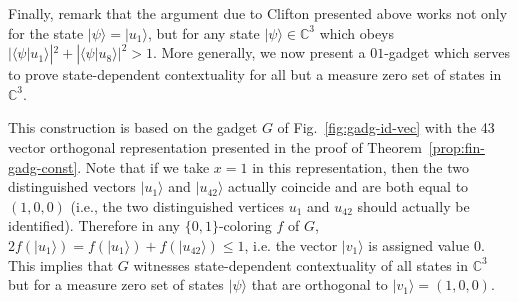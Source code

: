\documentclass[twocolumn, a4paper, superscriptaddress,nofootinbib, accepted=2020-08-07, hyperref]{quantumarticle}
\begin{document}
Finally, remark that the argument due to Clifton presented above works not only for the state $|\psi\rangle=|u_1\rangle$, but for any state $|\psi \rangle \in \mathbb{C}^3$ which obeys $| \langle \psi | u_1 \rangle|^2 + |\langle \psi | u_8 \rangle|^2 > 1$. More generally, we now present a $01$-gadget which serves to prove state-dependent contextuality for all but a measure zero set of states in $\mathbb{C}^3$. 

This construction is based on the gadget $G$ of Fig.~\ref{fig:gadg-id-vec} with the 43 vector orthogonal representation presented in the proof of Theorem~\ref{prop:fin-gadg-const}. Note that if we take $x=1$ in this representation, then the two distinguished vectors $|u_1\rangle$ and $|u_{42}\rangle$ actually coincide and are both equal to $(1,0,0)$ (i.e., the two distinguished vertices $u_1$ and $u_{42}$ should actually be identified). Therefore in any $\{0,1\}$-coloring $f$ of $G$, $2f(|u_1\rangle)=f(|u_1\rangle)+f(|u_{42}\rangle)\leq 1$, i.e. the vector $|v_1\rangle$ is assigned value $0$. This implies that $G$ witnesses state-dependent contextuality of all states in $\mathbb{C}^3$ but for a measure zero set of states $|\psi \rangle$ that are orthogonal to $|v_1\rangle=(1,0,0)$.
\end{document}
